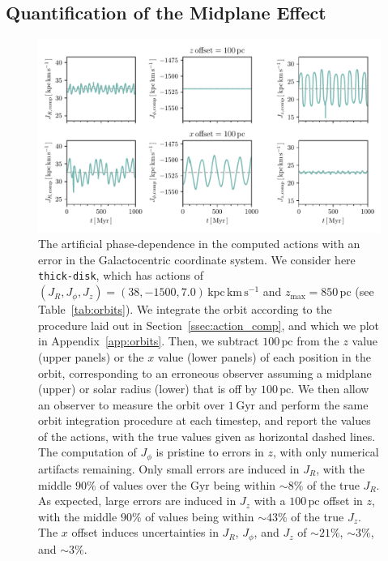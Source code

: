 \documentclass[twocolumn]{aastex62}
\newcommand{\pc}{\text{pc}}
\newcommand{\Gyr}{\text{Gyr}}
\newcommand{\kms}{\text{km}\,\text{s}^{-1}}
\newcommand{\actunit}{\text{kpc}\,\kms}
\newcommand{\thick}{\texttt{thick-disk}}
\begin{document}
\subsection{Quantification of the Midplane Effect} \label{ssec:quant}

\begin{figure}[ht!]
\begin{center}
\includegraphics[width=\textwidth]{fig/schmactions_one_orbit.pdf}
\end{center}
\caption{The artificial phase-dependence in the computed actions with an
error in the Galactocentric coordinate system. We consider here \thick{},
which has actions of $(J_R, J_{\phi}, J_z) = (38, -1500, 7.0)\,\actunit$ and
$z_{\text{max}}=850\,\pc$ (see Table~\ref{tab:orbits}). We integrate the orbit
according to the procedure laid out in Section~\ref{ssec:action_comp}, and
which we plot in Appendix~\ref{app:orbits}. Then, we subtract $100\,\pc$ from
the $z$ value (upper panels) or the $x$ value (lower panels) of each position
in the orbit, corresponding to an erroneous observer assuming a midplane
(upper) or solar radius (lower) that is off by $100\,\pc$. We then allow an
observer to measure the orbit over $1\,\Gyr$ and perform the same orbit
integration procedure at each timestep, and report the values of the actions,
with the true values given as horizontal dashed lines. The computation of
$J_{\phi}$ is pristine to errors in $z$, with only numerical artifacts
remaining. Only small errors are induced in $J_R$, with the middle $90\%$ of
values over the $\Gyr$ being within $\sim8\%$ of the true $J_R$. As expected,
large errors are induced in $J_z$ with a $100\,\pc$ offset in $z$, with the
middle $90\%$ of values being within $\sim43\%$ of the true $J_z$. The $x$
offset induces uncertainties in $J_R$, $J_{\phi}$, and $J_z$ of $\sim21\%$,
$\sim3\%$, and $\sim3\%$.}
\label{fig:one_orbit_wrong_ref}
\end{figure}
\end{document}
